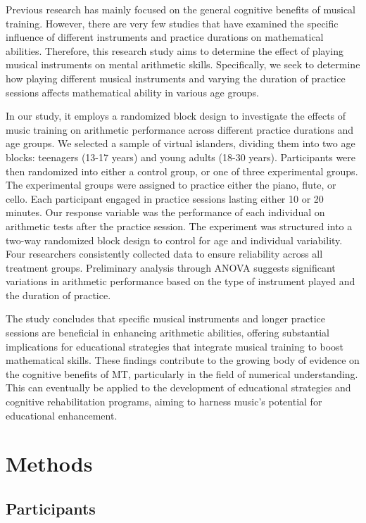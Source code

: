 \documentclass[11pt]{article}
\begin{document}
Previous research has mainly focused on the general cognitive benefits of musical training. However, there are very few studies that have examined the specific influence of different instruments and practice durations on mathematical abilities. Therefore, this research study aims to determine the effect of playing musical instruments on mental arithmetic skills. Specifically, we seek to determine how playing different musical instruments and varying the duration of practice sessions affects mathematical ability in various age groups.

In our study, it employs a randomized block design to investigate the effects of music training on arithmetic performance across different practice durations and age groups. We selected a sample of virtual islanders, dividing them into two age blocks: teenagers (13-17 years) and young adults (18-30 years). Participants were then randomized into either a control group, or one of three experimental groups. The experimental groups were assigned to practice either the piano, flute, or cello. Each participant engaged in practice sessions lasting either 10 or 20 minutes. Our response variable was the performance of each individual on arithmetic tests after the practice session. The experiment was structured into a two-way randomized block design to control for age and individual variability. Four researchers consistently collected data to ensure reliability across all treatment groups. Preliminary analysis through ANOVA suggests significant variations in arithmetic performance based on the type of instrument played and the duration of practice.

The study concludes that specific musical instruments and longer practice sessions are beneficial in enhancing arithmetic abilities, offering substantial implications for educational strategies that integrate musical training to boost mathematical skills. These findings contribute to the growing body of evidence on the cognitive benefits of MT, particularly in the field of numerical understanding. This can eventually be applied to the development of educational strategies and cognitive rehabilitation programs, aiming to harness music's potential for educational enhancement.

\section{Methods}
\subsection{Participants}
\end{document}
